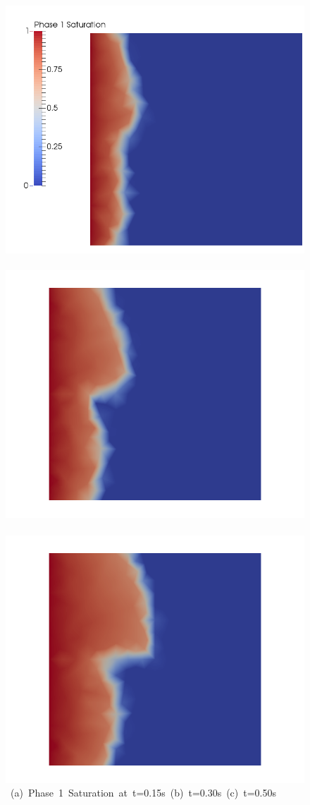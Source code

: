 \begin{landscape}
\begin{figure}[ht] 
\vbox{\vspace{-1cm}
\hbox{\includegraphics[width=.56\textwidth]{./Pics/PDFCase/PDFCase_Saturation_t_dot15.png}
      \includegraphics[width=.56\textwidth]{./Pics/PDFCase/PDFCase_Saturation_t_dot30.png}
      \includegraphics[width=.56\textwidth]{./Pics/PDFCase/PDFCase_Saturation_t_dot50.png}}
\vspace{0.cm}
\hbox{\hspace{0.5cm} (a) Phase 1 Saturation at t=0.15s \hspace{3.75cm} (b) t=0.30s \hspace{5.0cm} (c) t=0.50s}
\vspace{0.5cm}
}
\end{figure}
\end{landscape}
